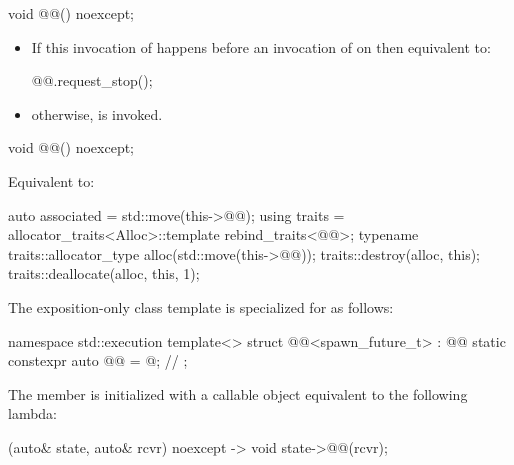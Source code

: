 %
\begin{itemdecl}
void @@() noexcept;
\end{itemdecl}

\begin{itemdescr}
\pnum
\effects
\begin{itemize}
\item
If this invocation of  happens before
an invocation of  on  then
equivalent to:
\begin{codeblock}
@@.request_stop();
\end{codeblock}
\item
otherwise,
 is invoked.
\end{itemize}
\end{itemdescr}

%
\begin{itemdecl}
void @@() noexcept;
\end{itemdecl}

\begin{itemdescr}
\pnum
\effects
Equivalent to:
\begin{codeblock}
auto associated = std::move(this->@@);
{
  using traits = allocator_traits<Alloc>::template rebind_traits<@@>;
  typename traits::allocator_type alloc(std::move(this->@@));
  traits::destroy(alloc, this);
  traits::deallocate(alloc, this, 1);
}
\end{codeblock}
\end{itemdescr}

\pnum
The exposition-only class template 
is specialized for  as follows:

%
\begin{codeblock}
namespace std::execution {
  template<>
  struct @@<spawn_future_t> : @@ {
    static constexpr auto @@ = @\seebelow@;                    // \expos
  };
}
\end{codeblock}

\pnum
The member 
is initialized with a callable object equivalent to the following lambda:
\begin{codeblock}
[](auto& state, auto& rcvr) noexcept -> void {
  state->@@(rcvr);
}
\end{codeblock}

